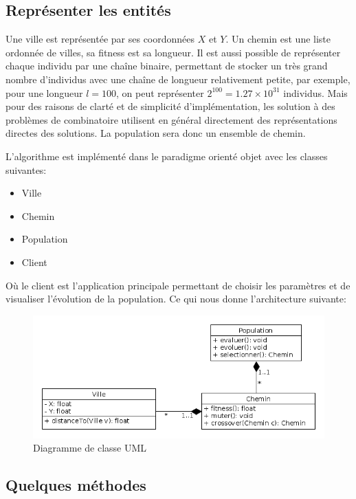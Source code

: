 \documentclass[12pt]{article}
\begin{document}
\subsection{Représenter les entités}
\label{sec-2-1}

Une ville est représentée par ses coordonnées $X$ et $Y$.
Un chemin est une liste ordonnée de villes, sa fitness est sa longueur. Il est aussi possible de représenter chaque individu par une chaîne
binaire, permettant de stocker un très grand nombre d'individus avec une chaîne de longueur relativement petite, par exemple, pour une longueur
$l = 100$, on peut représenter $2^{100} = 1.27 \times 10^{31}$ individus. Mais pour des raisons de clarté et de simplicité d'implémentation,
les solution à des problèmes de combinatoire utilisent en général directement des représentations directes des solutions.
La population sera donc un ensemble de chemin.

L'algorithme est implémenté dans le paradigme orienté objet avec les classes suivantes:
\begin{itemize}
\item Ville
\item Chemin
\item Population
\item Client
\end{itemize}

Où le client est l'application principale permettant de choisir les paramètres et de visualiser l'évolution de la population.
Ce qui nous donne l'architecture suivante:

\begin{figure}[H]
\centering
\includegraphics[width=.9\linewidth]{./UML_Class.png}
\caption{Diagramme de classe UML}
\end{figure}

\subsection{Quelques méthodes}
\label{sec-2-2}
\end{document}
